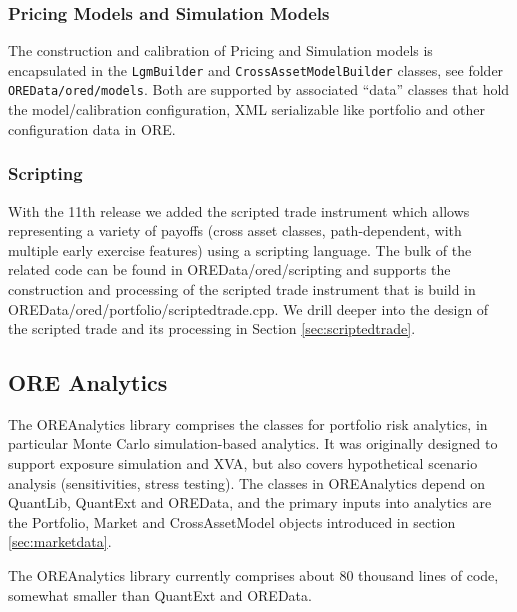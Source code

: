 \documentclass[12pt, a4paper]{report}
\begin{document}
\subsubsection{Pricing Models and Simulation Models}
The construction and calibration of Pricing and Simulation models is encapsulated in the {\tt LgmBuilder} and {\tt CrossAssetModelBuilder} classes, see folder {\tt OREData/ored/models}. Both are supported by associated ``data'' classes that hold
the model/calibration configuration, XML serializable like portfolio and other configuration data in ORE.

\subsubsection{Scripting}

With the 11th release we added the scripted trade instrument which allows representing a variety of payoffs (cross asset classes, path-dependent, with multiple early exercise features) using a scripting language. The bulk of the related code can be found in OREData/ored/scripting and supports the construction and processing of the scripted trade instrument that is build in OREData/ored/portfolio/scriptedtrade.cpp. We drill deeper into the design of the scripted trade and its processing in Section \ref{sec:scriptedtrade}.

\subsection{ORE Analytics}

The OREAnalytics library comprises the classes for portfolio risk analytics, in particular Monte Carlo simulation-based analytics. It was originally designed to support exposure simulation and XVA, but also covers hypothetical scenario analysis
(sensitivities, stress testing). The classes in OREAnalytics depend on QuantLib, QuantExt and OREData, and the primary inputs into analytics are the Portfolio, Market and CrossAssetModel objects introduced in section \ref{sec:marketdata}.

The OREAnalytics library currently comprises about 80 thousand lines of code, somewhat smaller than QuantExt and OREData.
\end{document}
